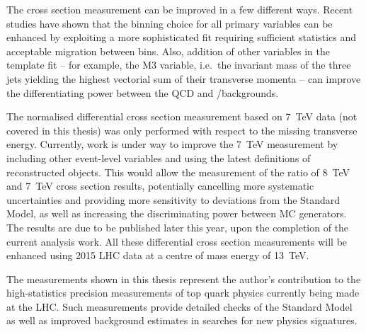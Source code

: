 The cross section measurement can be improved in a few different ways. Recent studies have shown that the binning choice
for all primary variables can be enhanced by exploiting a more sophisticated fit requiring sufficient statistics and
acceptable migration between bins. Also, addition of other variables in the template fit -- for example, the M3
variable, i.e.\ the invariant mass of the three jets yielding the highest vectorial sum of their transverse momenta --
can improve the differentiating power between the QCD and \W/\ZpJets backgrounds.

The normalised differential cross section measurement based on \SI{7}{\TeV} data \autocite{xsection_PAS_7TeV} (not
covered in this thesis) was only performed with respect to the missing transverse energy. Currently, work is under way
to improve the \SI{7}{\TeV} measurement by including other event-level variables and using the latest definitions of
reconstructed objects. This would allow the measurement of the ratio of \SI{8}{\TeV} and \SI{7}{\TeV} cross section
results, potentially cancelling more systematic uncertainties and providing more sensitivity to deviations from the
Standard Model, as well as increasing the discriminating power between MC generators. The results are due to be
published later this year, upon the completion of the current analysis work. All these differential cross section
measurements will be enhanced using 2015 LHC data at a centre of mass energy of \SI{13}{\TeV}.

The measurements shown in this thesis represent the author's contribution to the high-statistics precision measurements
of top quark physics currently being made at the LHC. Such measurements provide detailed checks of the Standard Model as
well as improved background estimates in searches for new physics signatures.




